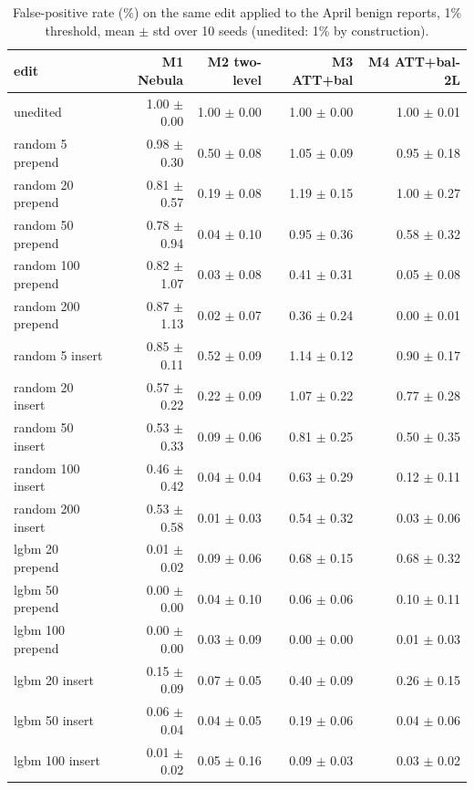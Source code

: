 \begin{table}[t]
\centering
\small
\caption{False-positive rate (\%) on the same edit applied to the April benign reports, 1\% threshold, mean $\pm$ std over 10 seeds (unedited: 1\% by construction).}
\label{tab:T5c_attack_padded_benign_fpr_1pct}
\begin{tabular}{lrrrr}
\toprule
edit & M1 Nebula & M2 two-level & M3 ATT+bal & M4 ATT+bal-2L \\
\midrule
unedited & 1.00 $\pm$ 0.00 & 1.00 $\pm$ 0.00 & 1.00 $\pm$ 0.00 & 1.00 $\pm$ 0.01 \\
random 5 prepend & 0.98 $\pm$ 0.30 & 0.50 $\pm$ 0.08 & 1.05 $\pm$ 0.09 & 0.95 $\pm$ 0.18 \\
random 20 prepend & 0.81 $\pm$ 0.57 & 0.19 $\pm$ 0.08 & 1.19 $\pm$ 0.15 & 1.00 $\pm$ 0.27 \\
random 50 prepend & 0.78 $\pm$ 0.94 & 0.04 $\pm$ 0.10 & 0.95 $\pm$ 0.36 & 0.58 $\pm$ 0.32 \\
random 100 prepend & 0.82 $\pm$ 1.07 & 0.03 $\pm$ 0.08 & 0.41 $\pm$ 0.31 & 0.05 $\pm$ 0.08 \\
random 200 prepend & 0.87 $\pm$ 1.13 & 0.02 $\pm$ 0.07 & 0.36 $\pm$ 0.24 & 0.00 $\pm$ 0.01 \\
random 5 insert & 0.85 $\pm$ 0.11 & 0.52 $\pm$ 0.09 & 1.14 $\pm$ 0.12 & 0.90 $\pm$ 0.17 \\
random 20 insert & 0.57 $\pm$ 0.22 & 0.22 $\pm$ 0.09 & 1.07 $\pm$ 0.22 & 0.77 $\pm$ 0.28 \\
random 50 insert & 0.53 $\pm$ 0.33 & 0.09 $\pm$ 0.06 & 0.81 $\pm$ 0.25 & 0.50 $\pm$ 0.35 \\
random 100 insert & 0.46 $\pm$ 0.42 & 0.04 $\pm$ 0.04 & 0.63 $\pm$ 0.29 & 0.12 $\pm$ 0.11 \\
random 200 insert & 0.53 $\pm$ 0.58 & 0.01 $\pm$ 0.03 & 0.54 $\pm$ 0.32 & 0.03 $\pm$ 0.06 \\
lgbm 20 prepend & 0.01 $\pm$ 0.02 & 0.09 $\pm$ 0.06 & 0.68 $\pm$ 0.15 & 0.68 $\pm$ 0.32 \\
lgbm 50 prepend & 0.00 $\pm$ 0.00 & 0.04 $\pm$ 0.10 & 0.06 $\pm$ 0.06 & 0.10 $\pm$ 0.11 \\
lgbm 100 prepend & 0.00 $\pm$ 0.00 & 0.03 $\pm$ 0.09 & 0.00 $\pm$ 0.00 & 0.01 $\pm$ 0.03 \\
lgbm 20 insert & 0.15 $\pm$ 0.09 & 0.07 $\pm$ 0.05 & 0.40 $\pm$ 0.09 & 0.26 $\pm$ 0.15 \\
lgbm 50 insert & 0.06 $\pm$ 0.04 & 0.04 $\pm$ 0.05 & 0.19 $\pm$ 0.06 & 0.04 $\pm$ 0.06 \\
lgbm 100 insert & 0.01 $\pm$ 0.02 & 0.05 $\pm$ 0.16 & 0.09 $\pm$ 0.03 & 0.03 $\pm$ 0.02 \\
\bottomrule
\end{tabular}
\end{table}

